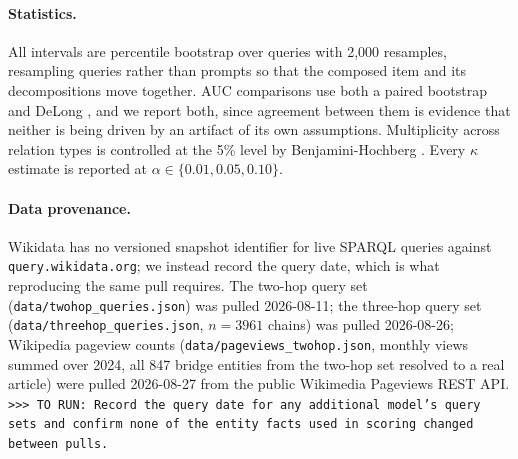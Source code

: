 \documentclass{article}
\newcommand{\TORUN}[1]{{\color{blue}\texttt{>{}>{}> TO RUN: #1}}}
\begin{document}
\paragraph{Statistics.} All intervals are percentile bootstrap over queries with 2{,}000 resamples,
resampling queries rather than prompts so that the composed item and its decompositions move
together. AUC comparisons use both a paired bootstrap and DeLong \citep{delong1988comparing}, and we
report both, since agreement between them is evidence that neither is being driven by an artifact of
its own assumptions. Multiplicity across relation types is controlled at the 5\% level by
Benjamini-Hochberg \citep{benjamini1995controlling}. Every $\kappa$ estimate is reported at
$\alpha\in\{0.01,0.05,0.10\}$.

\paragraph{Data provenance.} Wikidata has no versioned snapshot identifier for live SPARQL queries
against \texttt{query.wikidata.org}; we instead record the query date, which is what reproducing the
same pull requires. The two-hop query set (\texttt{data/twohop\_queries.json}) was pulled 2026-08-11;
the three-hop query set (\texttt{data/threehop\_queries.json}, $n=3961$ chains) was pulled 2026-08-26;
Wikipedia pageview counts (\texttt{data/pageviews\_twohop.json}, monthly views summed over 2024, all
847 bridge entities from the two-hop set resolved to a real article) were pulled 2026-08-27 from the
public Wikimedia Pageviews REST API. \TORUN{Record the query date for any additional model's query
sets and confirm none of the entity facts used in scoring changed between pulls.}

\end{document}
